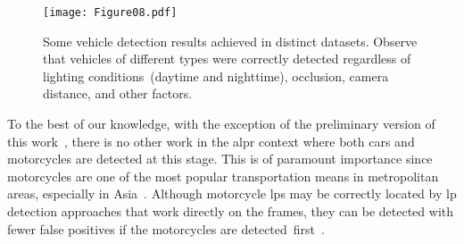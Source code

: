 \begin{table}[!htb]
\centering
\caption{Vehicle detection results achieved across all datasets.}
\label{tab:results:vehicle_detection}
\vspace{1mm}
\end{table}

\begin{figure}[!htb]
    \centering
    
    \texttt{[image: Figure08.pdf]} 
    
    \vspace{-2mm}
    
    \caption{Some vehicle detection results achieved in distinct datasets. Observe that vehicles of different types were correctly detected regardless of lighting conditions~(daytime and nighttime), occlusion, camera distance, and other factors.}
    \label{fig:results:veicle_detection_tps}
\end{figure}

To the best of our knowledge, with the exception of the preliminary version of this work~\citep{laroca2018robust}, there is no other work in the \gls*{alpr} context where both cars and motorcycles are detected at this stage.
This is of paramount importance since motorcycles are one of the most popular transportation means in metropolitan areas, especially in Asia~\citep{hsu2016comparison}.
Although motorcycle \glspl*{lp} may be correctly located by \gls*{lp} detection approaches that work directly on the frames, they can be detected with fewer false positives if the motorcycles are detected~first~\citep{hsu2015comparison}. 

